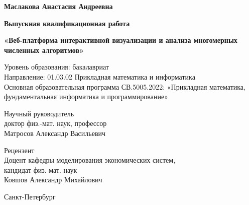 \documentclass[12pt, oneside]{book}
\begin{document}
\thispagestyle{empty}
\begin{center}

        \vspace{0.5em}
        
        \vspace{0.6em}
        
        

        \vspace{7em}
        \textbf{\large Маслакова Анастасия Андреевна}

        \vspace{2em}
        \textbf{\Large Выпускная квалификационная работа}
        
        \vspace{2.5em}
        \textbf{\Large «Веб-платформа интерактивной визуализации и анализа многомерных численных алгоритмов»}

        \vspace{4em}
        Уровень образования: бакалавриат \\
        Направление: 01.03.02 Прикладная математика и информатика \\
        Основная образовательная программа СВ.5005.2022:
        «Прикладная математика, фундаментальная информатика и программирование»

        \vspace{4em}
        \begin{flushright}
                Научный руководитель \\
                доктор физ.-мат. наук, профессор \\
                Матросов Александр Васильевич
        \end{flushright}

        \begin{flushright}
                Рецензент \\
                Доцент кафедры моделирования экономических   систем, \\
                кандидат физ.-мат. наук \\
                Ковшов Александр Михайлович
        \end{flushright}

        \vfill
        Санкт-Петербург\\ \the\year
\end{center}
\end{document}
